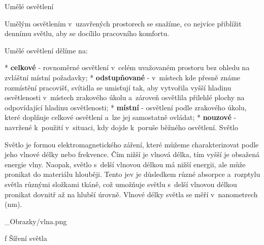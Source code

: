 \chap Umělé osvětlení

Umělým osvětlením v~uzavřených prostorech se snažíme, co nejvíce přiblížit dennímu světlu, aby se docílilo pracovního komfortu.

Umělé osvětlení dělíme na:

\begitems
* {\bf celkové} - rovnoměrné osvětlení v~celém uvažovaném prostoru bez ohledu na zvláštní místní požadavky;
* {\bf odstupňované} - v~místech kde přesně známe rozmístění pracovišť, svítidla se umisťují tak, aby vytvořila
    vyšší hladinu osvětlenosti v~místech zrakového úkolu a~zároveň osvětlila přilehlé plochy na odpovídající hladinu osvětlenosti;
* {\bf místní} - osvětlení podle zrakového úkolu, které doplňuje celkové osvětlení a~lze jej samostatně ovládat;
* {\bf nouzové}  - navržené k~použití v~situaci, kdy dojde k~poruše běžného osvětlení.
\enditems
\sec Světlo


Světlo je formou elektromagnetického záření, které můžeme charakterizovat podle jeho vlnové délky nebo frekvence.
Čím nižší je vlnová délka, tím vyšší je obsažená energie vlny. Naopak, světlo s~delší vlnovou délkou má nižší energii,
ale může pronikat do materiálu hlouběji. Tento jev je důsledkem různé absorpce a~rozptylu světla různými složkami
tkáně, což umožňuje světlu s~delší vlnovou délkou pronikat dovnitř až na hlubší úrovně.
Vlnové délky světla se měří v~nanometrech (nm).

{}
\picw=10cm _Obrazky/vlna.png
\caption/f Šíření světla



